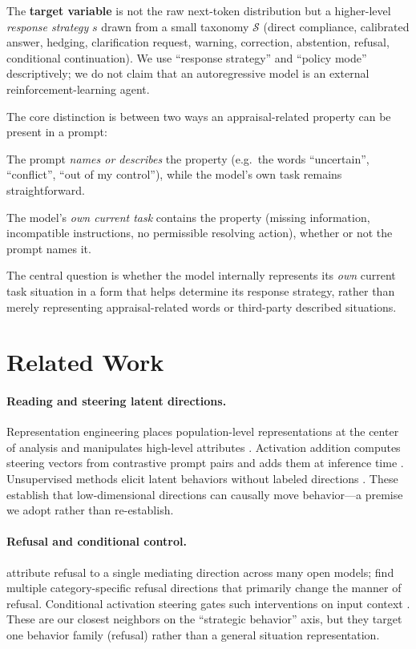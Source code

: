 \documentclass[11pt]{article}
\begin{document}
The \textbf{target variable} is not the raw next-token distribution but a
higher-level \emph{response strategy} $s$ drawn from a small taxonomy $\mathcal{S}$
(direct compliance, calibrated answer, hedging, clarification request, warning,
correction, abstention, refusal, conditional continuation). We use ``response
strategy'' and ``policy mode'' descriptively; we do not claim that an autoregressive
model is an external reinforcement-learning agent.

The core distinction is between two ways an appraisal-related property can be
present in a prompt:
\begin{description}[leftmargin=1.4em,style=nextline]
\item[Concept tracking.] The prompt \emph{names or describes} the property (e.g.\
the words ``uncertain'', ``conflict'', ``out of my control''), while the model's own
task remains straightforward.
\item[Task induction.] The model's \emph{own current task} contains the property
(missing information, incompatible instructions, no permissible resolving action),
whether or not the prompt names it.
\end{description}
The central question is whether the model internally represents its \emph{own}
current task situation in a form that helps determine its response strategy, rather
than merely representing appraisal-related words or third-party described
situations.

\section{Related Work}
\label{sec:related}

\paragraph{Reading and steering latent directions.}
Representation engineering places population-level representations at the center of
analysis and manipulates high-level attributes \citep{zou2023repe}. Activation
addition computes steering vectors from contrastive prompt pairs and adds them at
inference time \citep{turner2023actadd}. Unsupervised methods elicit latent
behaviors without labeled directions \citep{mack2024melbo}. These establish that
low-dimensional directions can causally move behavior---a premise we adopt rather
than re-establish.

\paragraph{Refusal and conditional control.}
\citet{arditi2024refusal} attribute refusal to a single mediating direction across
many open models; \citet{joad2026morerefusal} find multiple category-specific
refusal directions that primarily change the manner of refusal. Conditional
activation steering gates such interventions on input context \citep{lee2024cast}.
These are our closest neighbors on the ``strategic behavior'' axis, but they target
one behavior family (refusal) rather than a general situation representation.
\end{document}
